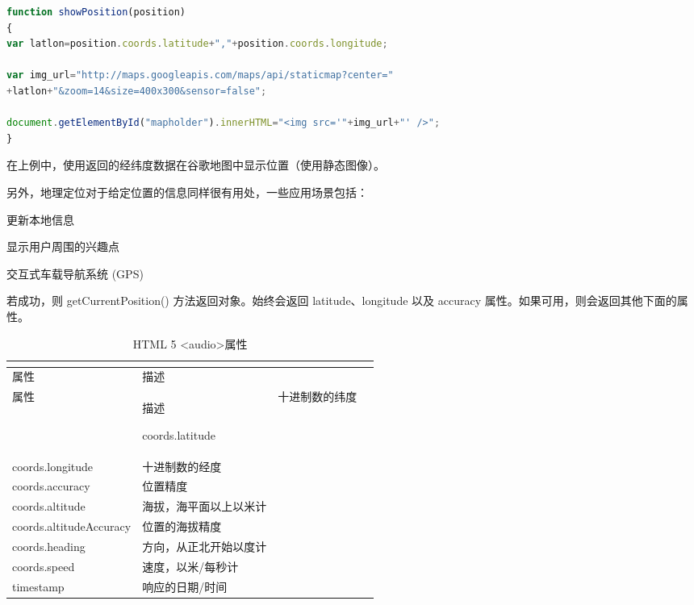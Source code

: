 \begin{lstlisting}[language=JavaScript]
function showPosition(position)
{
var latlon=position.coords.latitude+","+position.coords.longitude;

var img_url="http://maps.googleapis.com/maps/api/staticmap?center="
+latlon+"&zoom=14&size=400x300&sensor=false";

document.getElementById("mapholder").innerHTML="<img src='"+img_url+"' />";
}
\end{lstlisting}

在上例中，使用返回的经纬度数据在谷歌地图中显示位置（使用静态图像）。

另外，地理定位对于给定位置的信息同样很有用处，一些应用场景包括：

\begin{compactitem}
\item 更新本地信息
\item 显示用户周围的兴趣点
\item 交互式车载导航系统 (GPS)
\end{compactitem}

若成功，则 getCurrentPosition() 方法返回对象。始终会返回 latitude、longitude 以及 accuracy 属性。如果可用，则会返回其他下面的属性。


\begin{longtable}{|p{120pt}|p{120pt}|}
\tabularnewline\hline
属性		& 描述
\endhead

\caption{HTML 5 <audio>属性}\\
\hline
属性		& 描述
\endfirsthead

\endfoot

\endlastfoot

\hline
coords.latitude	&十进制数的纬度\\
\hline
coords.longitude	&十进制数的经度\\
\hline
coords.accuracy	&位置精度\\
\hline
coords.altitude	&海拔，海平面以上以米计\\
\hline
coords.altitudeAccuracy	&位置的海拔精度\\
\hline
coords.heading	&方向，从正北开始以度计\\
\hline
coords.speed		&速度，以米/每秒计\\
\hline
timestamp		&响应的日期/时间\\
\hline

\end{longtable}


